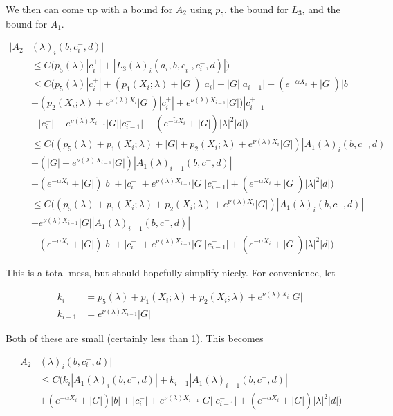 \documentclass[12pt]{article}
\begin{document}
\begin{enumerate}
We then can come up with a bound for $A_2$ using $p_5$, the bound for $L_3$, and the bound for $A_1$.

\begin{align*}
|A_2&(\lambda)_i(b, c_i^-, d)| \\
&\leq C \Big( p_5(\lambda)|c_i^+| + |L_3(\lambda)_i(a_i, b, c_i^+, c_i^-, d)| \Big)\\
&\leq C \Big( p_5(\lambda)|c_i^+| + (p_1(X_i; \lambda) + |G|)|a_i| + |G||a_{i-1}| + (e^{-\alpha X_i} + |G|) |b| \\
&+ ( p_2(X_i; \lambda) + e^{\nu(\lambda)X_i} |G|) |c_i^+| + e^{\nu(\lambda)X_{i-1}} |G|) |c_{i-1}^+| \\
&+ |c_i^-| + e^{\nu(\lambda)X_{i-1}} |G||c_{i-1}^-| + (e^{-\tilde{\alpha} X_i} + |G|) |\lambda|^2 |d| \Big) \\
&\leq C \Big( (p_5(\lambda) + p_1(X_i; \lambda) + |G| + p_2(X_i; \lambda) + e^{\nu(\lambda)X_i} |G|) |A_1(\lambda)_i(b, c^-, d)|  \\
&+ (|G| + e^{\nu(\lambda)X_{i-1}} |G|)|A_1(\lambda)_{i-1}(b, c^-, d)|  \\
&+ (e^{-\alpha X_i} + |G|) |b| + |c_i^-| + e^{\nu(\lambda)X_{i-1}} |G||c_{i-1}^-| 
+ (e^{-\tilde{\alpha} X_i} + |G|) |\lambda|^2 |d| \Big) \\
&\leq C \Big( (p_5(\lambda) + p_1(X_i; \lambda) + p_2(X_i; \lambda) + e^{\nu(\lambda)X_i} |G|) |A_1(\lambda)_i(b, c^-, d)|  \\
&+ e^{\nu(\lambda)X_{i-1}} |G||A_1(\lambda)_{i-1}(b, c^-, d)|  \\
&+ (e^{-\alpha X_i} + |G|) |b| + |c_i^-| + e^{\nu(\lambda)X_{i-1}} |G||c_{i-1}^-| 
+ (e^{-\tilde{\alpha} X_i} + |G|) |\lambda|^2 |d| \Big)
\end{align*} 

This is a total mess, but should hopefully simplify nicely. For convenience, let

\begin{align*}
k_i &= p_5(\lambda) + p_1(X_i; \lambda) + p_2(X_i; \lambda) + e^{\nu(\lambda)X_i} |G|\\
k_{i-1} &= e^{\nu(\lambda)X_{i-1}} |G|
\end{align*}

Both of these are small (certainly less than 1). This becomes

\begin{align*}
|A_2&(\lambda)_i(b, c_i^-, d)| \\
&\leq C \Big( k_i |A_1(\lambda)_i(b, c^-, d)| + k_{i-1} |A_1(\lambda)_{i-1}(b, c^-, d)|  \\
&+ (e^{-\alpha X_i} + |G|) |b| + |c_i^-| + e^{\nu(\lambda)X_{i-1}} |G||c_{i-1}^-| 
+ (e^{-\tilde{\alpha} X_i} + |G|) |\lambda|^2 |d| \Big)
\end{align*} 


\end{enumerate}
\end{document}
